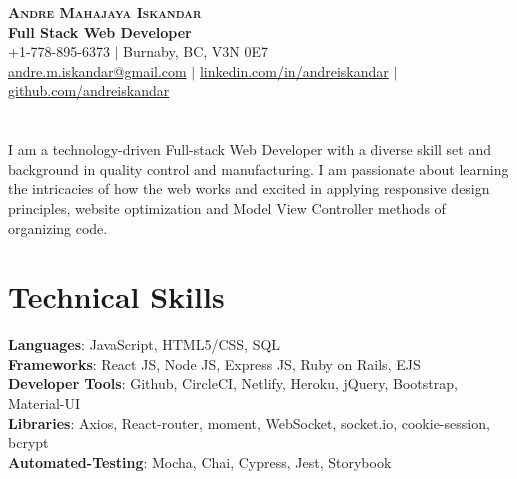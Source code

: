 \documentclass[letterpaper,11pt]{article}
\begin{document}
\begin{center}
    \textbf{\Huge \scshape Andre Mahajaya Iskandar} \\ \vspace{5pt}
    \textbf{\large Full Stack Web Developer}\vspace{5pt} \\
    \small \faPhoneSquare{ }+1-778-895-6373 $|$ \faHome{ }Burnaby, BC, V3N 0E7 \\
    \href{mailto:andre.m.iskandar@gmail.com}{\faEnvelope{ }andre.m.iskandar@gmail.com} $|$ 
    \href{https://linkedin.com/in/andreiskandar}{\faLinkedin{ }linkedin.com/in/andreiskandar} $|$
    \href{https://github.com/andreiskandar}{\faGithub{ }github.com/andreiskandar} \vspace{-10pt}
\end{center}

\section{}
I am a technology-driven Full-stack Web Developer with a diverse skill set and background in quality control and manufacturing. I am passionate about learning the intricacies of how the web works and excited in applying responsive design principles, website optimization and Model View Controller methods of organizing code. 

\section{Technical Skills}

 \begin{itemize}[leftmargin=0.15in, label={}]
    \small{\item{
     \textbf{Languages}{: JavaScript, HTML5/CSS, SQL} \\
     \textbf{Frameworks}{: React JS, Node JS, Express JS, Ruby on Rails, EJS} \\
     \textbf{Developer Tools}{: Github, CircleCI, Netlify, Heroku, jQuery, Bootstrap, Material-UI} \\
     \textbf{Libraries}{: Axios, React-router, moment, WebSocket, socket.io, cookie-session, bcrypt } \\
     \textbf{Automated-Testing}{: Mocha, Chai, Cypress, Jest, Storybook }
    }}
 \end{itemize}

\end{document}
